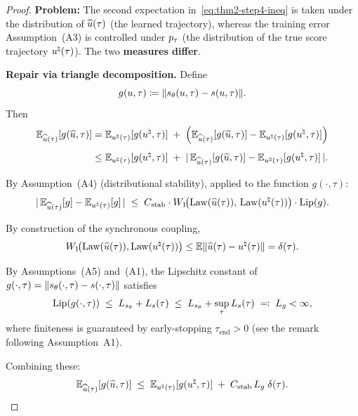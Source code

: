 \begin{proof}
\noindent
\textbf{Problem:} The second expectation in~\eqref{eq:thm2-step4-ineq} is taken under the distribution of $\widehat{u}(\tau)$ (the learned trajectory), whereas the training error Assumption~(A3) is controlled under $p_{\tau}$ (the distribution of the true score trajectory $u^{\natural}(\tau)$). The two \textbf{measures differ}.

\noindent
\textbf{Repair via triangle decomposition.} Define
\begin{equation}
g(u, \tau) \coloneqq \lVert s_{\theta}(u, \tau) - s(u, \tau) \rVert.
\label{eq:thm2-step5-g}
\end{equation}
Then
\begin{align}
\mathbb{E}_{\widehat{u}(\tau)}[g(\widehat{u}, \tau)]
&= \mathbb{E}_{u^{\natural}(\tau)}[g(u^{\natural}, \tau)]
   \;+\;
   \Bigl(\mathbb{E}_{\widehat{u}(\tau)}[g(\widehat{u}, \tau)] - \mathbb{E}_{u^{\natural}(\tau)}[g(u^{\natural}, \tau)]\Bigr) \notag \\[4pt]
&\le \mathbb{E}_{u^{\natural}(\tau)}[g(u^{\natural}, \tau)]
   \;+\;
   \lvert \,\mathbb{E}_{\widehat{u}(\tau)}[g(\widehat{u}, \tau)] - \mathbb{E}_{u^{\natural}(\tau)}[g(u^{\natural}, \tau)]\, \rvert.
\label{eq:thm2-step5-decomp}
\end{align}

By Assumption~(A4) (distributional stability), applied to the function $g(\cdot, \tau)$:
\begin{equation}
\lvert \,\mathbb{E}_{\widehat{u}(\tau)}[g] - \mathbb{E}_{u^{\natural}(\tau)}[g]\, \rvert
\;\le\;
C_{\mathrm{stab}} \cdot W_{1}\!\bigl(\mathrm{Law}(\widehat{u}(\tau)),\, \mathrm{Law}(u^{\natural}(\tau))\bigr) \cdot \mathrm{Lip}(g).
\label{eq:thm2-step5-A4}
\end{equation}

By construction of the synchronous coupling,
\begin{equation}
W_{1}\!\bigl(\mathrm{Law}(\widehat{u}(\tau)), \mathrm{Law}(u^{\natural}(\tau))\bigr) \le \mathbb{E}\lVert \widehat{u}(\tau) - u^{\natural}(\tau) \rVert = \delta(\tau).
\label{eq:thm2-step5-W1}
\end{equation}

By Assumptions~(A5) and~(A1), the Lipschitz constant of $g(\cdot, \tau) = \lVert s_{\theta}(\cdot, \tau) - s(\cdot, \tau) \rVert$ satisfies
\begin{equation}
\mathrm{Lip}(g(\cdot, \tau)) \;\le\; L_{s_{\theta}} + L_{s}(\tau) \;\le\; L_{s_{\theta}} + \sup_{\tau} L_{s}(\tau) \;\eqqcolon\; L_{g} < \infty,
\label{eq:thm2-step5-Lg}
\end{equation}
where finiteness is guaranteed by early-stopping $\tau_{\mathrm{end}} > 0$ (see the remark following Assumption~A1).

Combining these:
\begin{equation}
\mathbb{E}_{\widehat{u}(\tau)}[g(\widehat{u}, \tau)]
\;\le\;
\mathbb{E}_{u^{\natural}(\tau)}[g(u^{\natural}, \tau)]
\;+\;
C_{\mathrm{stab}}\,L_{g}\;\delta(\tau).
\label{eq:thm2-step5-final}
\end{equation}


\end{proof}
